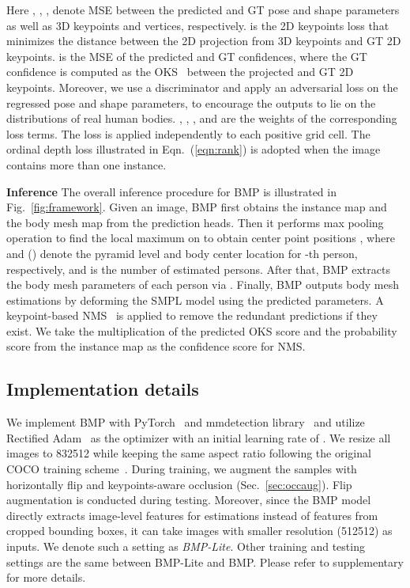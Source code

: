 \documentclass[final]{cvpr}
\newcommand{\myparagraph}[1]{{ \noindent \bf #1}}
\begin{document}
Here , , ,  denote MSE between the predicted and GT pose and shape parameters as well as 3D keypoints and vertices, respectively. 
 is the 2D keypoints loss that minimizes the distance between the 2D projection from 3D keypoints and GT 2D keypoints.
 is the MSE of the predicted and GT confidences, where the GT confidence is computed as the OKS~\cite{girdhar2018detect} between the projected and GT 2D keypoints.  
Moreover, we use a discriminator and apply an adversarial loss  on the regressed pose and shape parameters, to encourage the outputs to lie on the distributions of real human bodies.
, , ,  and  are the weights of the corresponding loss terms.
The loss  is applied independently to each positive grid cell. 
The ordinal depth loss  illustrated in Eqn.~(\ref{eqn:rank}) is adopted when the image contains more than one instance.

\myparagraph{Inference}
The overall inference procedure for BMP 
is illustrated in Fig.~\ref{fig:framework}. 
Given an image, BMP first obtains the instance map  and the body mesh map  from the prediction heads. 
Then it performs max pooling operation to find the local maximum on  to obtain center point positions , where  and () denote the pyramid level and body center location for -th person, respectively, and  is the number of estimated persons.
After that, BMP extracts the body mesh parameters of each person  via . 
Finally, BMP outputs body mesh estimations by deforming the SMPL model using the predicted parameters. 
A keypoint-based NMS~\cite{girdhar2018detect} is applied to remove the redundant predictions if they exist.
We take the multiplication of the predicted OKS score and the probability score from the instance map as the confidence score for NMS.

\subsection{Implementation details} \label{sec:implementation}
We implement BMP with PyTorch~\cite{paszke2017automatic} and mmdetection library~\cite{mmdetection} and utilize Rectified Adam~\cite{liu2019variance} as the optimizer with an initial learning rate of .  
We resize all images to 832512 while keeping the same aspect ratio following the original COCO training scheme~\cite{su2019multi,wang2019solo,jiang2020coherent}.
During training, we augment the samples with horizontally flip and keypoints-aware occlusion (Sec.~\ref{sec:occaug}). 
Flip augmentation is conducted during testing. 
Moreover, since the BMP model directly extracts image-level features for estimations instead of features from cropped bounding boxes, it can take images with smaller resolution (512512) as inputs. 
We denote such a setting as \textit{BMP-Lite}. Other training and testing settings are the same between BMP-Lite and BMP. 
Please refer to supplementary for more details. 
\end{document}
